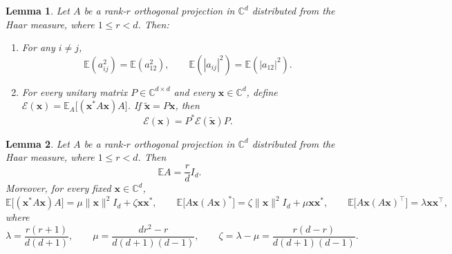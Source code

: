 \documentclass[10pt,a4paper]{amsart}
\newtheorem{lemma}{Lemma}
\newcommand{\C}{{\mathbb C}}
\newcommand{\E}{{\mathbb E}}
\newcommand{\vx}{{\mathbf x}}
\begin{document}
	\begin{lemma}
		\label{lem:expectation1}
		Let $A$ be a rank-$r$ orthogonal projection in $\C^d$ distributed from the Haar measure, where $1\le r<d$. Then:
		\begin{enumerate}
			\item For any $i\ne j$,
			\[
			\E(a_{ij}^2)=\E(a_{12}^2),\qquad \E(|a_{ij}|^2)=\E(|a_{12}|^2).
			\]
			\item For every unitary matrix $P\in\C^{d\times d}$ and every $\vx\in\C^d$, define
			$
			\mathcal E(\vx)=\E_A\big[(\vx^*A\vx)A\big]$. 
			If $\widetilde{\vx}=P\vx$, then
			\[
			\mathcal E(\vx)=P^*\mathcal E(\widetilde{\vx})P.
			\]
		\end{enumerate}
	\end{lemma}

	\begin{lemma}
		\label{lem:expectations}
		Let $A$ be a rank-$r$ orthogonal projection in $\C^d$ distributed from the Haar measure, where $1\le r<d$. Then
		\[
		\E A=\frac rd I_d.
		\]
		Moreover, for every fixed $\vx\in\C^d$,
		\[
		\E\big[(\vx^*A\vx)A\big]=\mu\|\vx\|^2I_d+\zeta\vx\vx^*,\qquad\E\big[A\vx(A\vx)^*\big]=\zeta\|\vx\|^2I_d+\mu\vx\vx^*,\qquad\E\big[A\vx(A\vx)^\top\big]=\lambda\vx\vx^\top,
		\]
		where
		\begin{equation}\label{defi_para}
			\lambda=\frac{r(r+1)}{d(d+1)},\qquad
			\mu=\frac{dr^2-r}{d(d+1)(d-1)},\qquad
			\zeta=\lambda-\mu=\frac{r(d-r)}{d(d+1)(d-1)}.
		\end{equation}
	\end{lemma}
\end{document}
